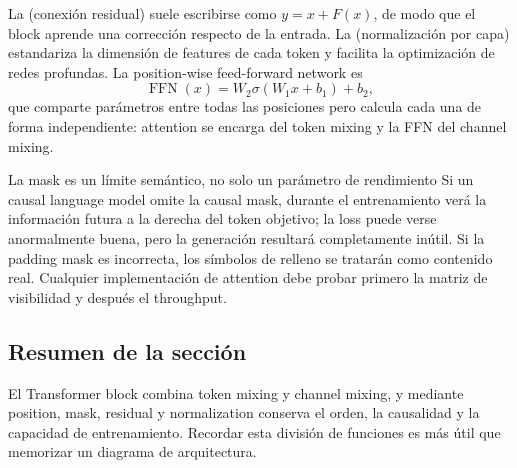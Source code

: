 La  (conexión residual) suele escribirse como $y=x+F(x)$, de modo que el block aprende una corrección respecto de la entrada. La  (normalización por capa) estandariza la dimensión de features de cada token y facilita la optimización de redes profundas. La position-wise feed-forward network es
\[
\operatorname{FFN}(x)=W_2\sigma(W_1x+b_1)+b_2,
\]
que comparte parámetros entre todas las posiciones pero calcula cada una de forma independiente: attention se encarga del token mixing y la FFN del channel mixing.

\begin{warningbox}{La mask es un límite semántico, no solo un parámetro de rendimiento}
Si un causal language model omite la causal mask, durante el entrenamiento verá la información futura a la derecha del token objetivo; la loss puede verse anormalmente buena, pero la generación resultará completamente inútil. Si la padding mask es incorrecta, los símbolos de relleno se tratarán como contenido real. Cualquier implementación de attention debe probar primero la matriz de visibilidad y después el throughput.
\end{warningbox}

\subsection{Resumen de la sección}

El Transformer block combina token mixing y channel mixing, y mediante position, mask, residual y normalization conserva el orden, la causalidad y la capacidad de entrenamiento. Recordar esta división de funciones es más útil que memorizar un diagrama de arquitectura.
